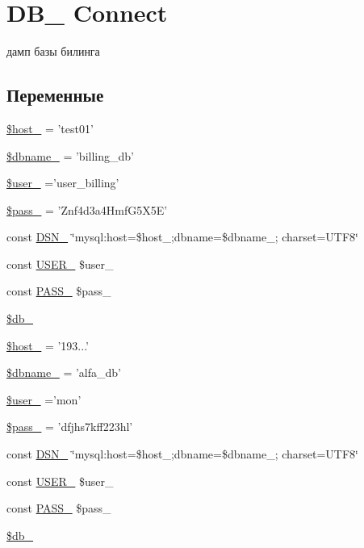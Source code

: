 \hypertarget{group___d_b__3}{\section{D\-B\-\_ Connect}
\label{group___d_b__3}
}


дамп базы билинга  


\subsection*{Переменные}
\begin{DoxyCompactItemize}
\item 
\hyperlink{group___d_b__3_ga9782328ab4366de7daff22fe23704413}{\$host\-\_} = 'test01'
\item 
\hyperlink{group___d_b__3_ga0def194ad2413b876916149582a2b1e9}{\$dbname\-\_} = 'billing\-\_\-db'
\item 
\hyperlink{group___d_b__3_ga5f8fd50656344478702668d5de68e802}{\$user\-\_} ='user\-\_\-billing'
\item 
\hyperlink{group___d_b__3_gaaa7650887f2a6a859cb6420d9dba37f0}{\$pass\-\_} = 'Znf4d3a4\-Hmf\-G5\-X5\-E'
\item 
const \hyperlink{group___d_b__3_ga84e111746d69b14479dbf3f99b4e21ad}{D\-S\-N\-\_} \char`\"{}mysql\-:host=\$host\-\_;dbname=\$dbname\-\_; charset=U\-T\-F8\char`\"{}
\item 
const \hyperlink{group___d_b__3_gabb4d4077f995367d73794dcfd8c50a23}{U\-S\-E\-R\-\_} \$user\-\_
\item 
const \hyperlink{group___d_b__3_gad7bf3ef090d7da2ae80f4a5f3ab4e67c}{P\-A\-S\-S\-\_} \$pass\-\_
\item 
\hyperlink{group___d_b__3_ga86a3d1ce31d6a69ea9c6b655a3fb10a1}{\$db\-\_}
\item 
\hyperlink{group___d_b__3_ga9782328ab4366de7daff22fe23704413}{\$host\-\_} = '193...'
\item 
\hyperlink{group___d_b__3_ga0def194ad2413b876916149582a2b1e9}{\$dbname\-\_} = 'alfa\-\_\-db'
\item 
\hyperlink{group___d_b__3_ga5f8fd50656344478702668d5de68e802}{\$user\-\_} ='mon'
\item 
\hyperlink{group___d_b__3_gaaa7650887f2a6a859cb6420d9dba37f0}{\$pass\-\_} = 'dfjhs7kff223hl'
\item 
const \hyperlink{group___d_b__3_ga84e111746d69b14479dbf3f99b4e21ad}{D\-S\-N\-\_} \char`\"{}mysql\-:host=\$host\-\_;dbname=\$dbname\-\_; charset=U\-T\-F8\char`\"{}
\item 
const \hyperlink{group___d_b__3_gabb4d4077f995367d73794dcfd8c50a23}{U\-S\-E\-R\-\_} \$user\-\_
\item 
const \hyperlink{group___d_b__3_gad7bf3ef090d7da2ae80f4a5f3ab4e67c}{P\-A\-S\-S\-\_} \$pass\-\_
\item 
\hyperlink{group___d_b__3_ga86a3d1ce31d6a69ea9c6b655a3fb10a1}{\$db\-\_}
\end{DoxyCompactItemize}


